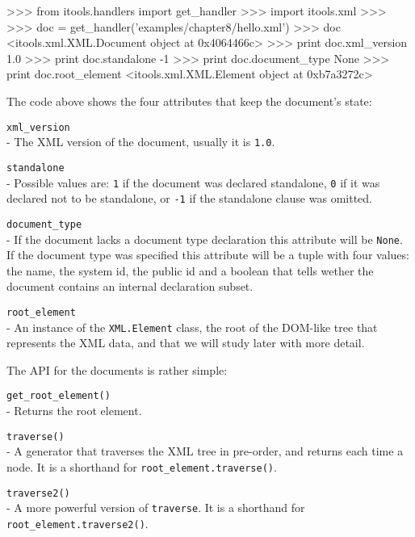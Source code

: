 \begin{code}
    >>> from itools.handlers import get_handler
    >>> import itools.xml
    >>>
    >>> doc = get_handler('examples/chapter8/hello.xml')
    >>> doc
    <itools.xml.XML.Document object at 0x4064466c>
    >>> print doc.xml_version
    1.0
    >>> print doc.standalone 
    -1
    >>> print doc.document_type
    None
    >>> print doc.root_element
    <itools.xml.XML.Element object at 0xb7a3272c>
\end{code}

The code above shows the four attributes that keep the document's state:

\begin{api}
    {\tt xml\_version}\\
    - The XML version of the document, usually it is {\tt 1.0}.

    {\tt standalone}\\
    - Possible values are: {\tt 1} if the document was declared standalone,
      {\tt 0} if it was declared not to be standalone, or {\tt -1} if the
      standalone clause was omitted.

    {\tt document\_type}\\
    - If the document lacks a document type declaration this attribute will
      be {\tt None}. If the document type was specified this attribute will
      be a tuple with four values: the name, the system id, the public id
      and a boolean that tells wether the document contains an internal
      declaration subset.

    {\tt root\_element}\\
    - An instance of the {\tt XML.Element} class, the root of the DOM-like
      tree that represents the XML data, and that we will study later with
      more detail.
\end{api}


The API for the documents is rather simple:

\begin{api}
    {\tt get\_root\_element()}\\
    - Returns the root element.

    {\tt traverse()}\\
    - A generator that traverses the XML tree in pre-order, and returns
      each time a node. It is a shorthand for {\tt root\_element.traverse()}.

    {\tt traverse2()}\\
    - A more powerful version of {\tt traverse}. It is a shorthand for
      {\tt root\_element.traverse2()}.
\end{api}


